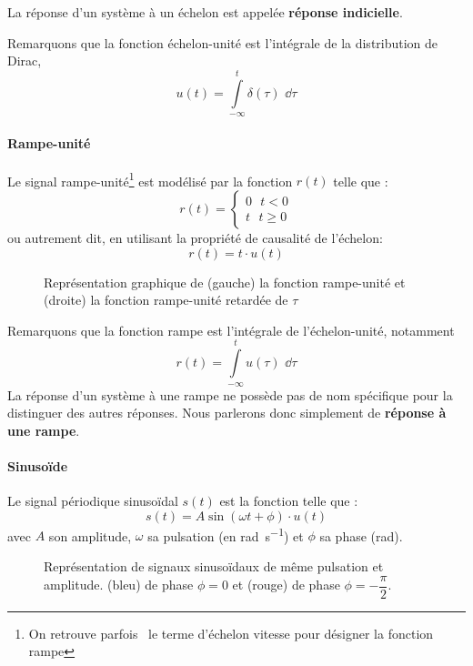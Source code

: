 La réponse d'un système à un échelon est appelée 
\textbf{réponse indicielle}.

Remarquons que la fonction échelon-unité est l'intégrale 
de la distribution de Dirac,
$$
u(t)=\int\limits_{-\infty}^{t} \delta(\tau)\,\,\dd{\tau}
$$
\paragraph{Rampe-unité}
Le signal rampe-unité\footnote{On retrouve parfois~\cite{sueurautomatique} 
le terme d'échelon vitesse pour désigner la fonction rampe} est
modélisé par la fonction $r(t)$ telle que :
$$
r(t)=
\begin{cases}
	0\,\,\,\,t<0 \\
	t\,\,\,\,t\geq0 
\end{cases}
$$
ou autrement dit, en utilisant la propriété de causalité de l'échelon:
$$
r(t)=t\cdot u(t)
$$

\begin{figure}[!h]
    \centering
    
\caption{Représentation graphique de (gauche) la fonction rampe-unité et 
                                     (droite) la fonction rampe-unité retardée
                                     de $\tau$
\label{fig-rampe}}
\end{figure}
Remarquons que la fonction rampe est l'intégrale de l'échelon-unité, notamment 
$$
r(t)=\int\limits_{-\infty}^{t} u(\tau)\,\,\dd{\tau}
$$
La réponse d'un système à une rampe ne possède pas de nom spécifique 
pour la distinguer des autres réponses. Nous parlerons donc simplement 
de \textbf{réponse à une rampe}. 
\paragraph{Sinuso\"ide}
Le signal périodique sinuso\"idal $s(t)$ est la fonction telle que :
$$
s(t)=A\sin{(\omega t +\phi)}\cdot u(t)
$$
avec $A$ son amplitude, $\omega$ sa pulsation (en \si{\radian\per\second}) 
et $\phi$ sa phase (\si{\radian}).
\begin{figure}[!h]
    \centering
    
    \caption{Représentation de signaux sinuso\"idaux de même pulsation 
             et amplitude. (bleu) de phase $\phi=0$ et 
            (rouge) de phase $\phi=-\dfrac{\pi}{2}$.\label{fig-sin}}
\end{figure}

